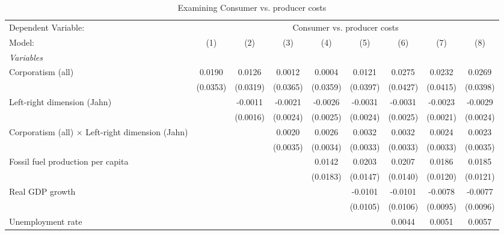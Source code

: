 
\begin{table}[htbp]
   \caption{Examining Consumer vs. producer costs}
   \centering
   \begin{tabular}{lcccccccc}
      \tabularnewline \midrule \midrule
      Dependent Variable: & \multicolumn{8}{c}{Consumer vs. producer costs}\\
      Model:                                                  & (1)      & (2)      & (3)      & (4)      & (5)      & (6)      & (7)      & (8)\\  
      \midrule
      \emph{Variables}\\
      Corporatism (all)                                       & 0.0190   & 0.0126   & 0.0012   & 0.0004   & 0.0121   & 0.0275   & 0.0232   & 0.0269\\   
                                                              & (0.0353) & (0.0319) & (0.0365) & (0.0359) & (0.0397) & (0.0427) & (0.0415) & (0.0398)\\   
      Left-right dimension (Jahn)                             &          & -0.0011  & -0.0021  & -0.0026  & -0.0031  & -0.0031  & -0.0023  & -0.0029\\   
                                                              &          & (0.0016) & (0.0024) & (0.0025) & (0.0024) & (0.0025) & (0.0021) & (0.0024)\\   
      Corporatism (all) $\times$ Left-right dimension (Jahn)  &          &          & 0.0020   & 0.0026   & 0.0032   & 0.0032   & 0.0024   & 0.0023\\   
                                                              &          &          & (0.0035) & (0.0034) & (0.0033) & (0.0033) & (0.0033) & (0.0035)\\   
      Fossil fuel production per capita                       &          &          &          & 0.0142   & 0.0203   & 0.0207   & 0.0186   & 0.0185\\   
                                                              &          &          &          & (0.0183) & (0.0147) & (0.0140) & (0.0120) & (0.0121)\\   
      Real GDP growth                                         &          &          &          &          & -0.0101  & -0.0101  & -0.0078  & -0.0077\\   
                                                              &          &          &          &          & (0.0105) & (0.0106) & (0.0095) & (0.0096)\\   
      Unemployment rate                                       &          &          &          &          &          & 0.0044   & 0.0051   & 0.0057\\   

\end{tabular}
\end{table}

